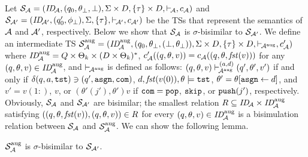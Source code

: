 Let ${\cal S}_{{\cal A}}=(\mathit{ID}_{\!{\cal A}},(q_0,\theta_{\bot},\bot),
\Sigma\times D,\{\tau\}\times D,{\vdash_{\!{\cal A}}},c_{{\cal A}})$
and ${\cal S}_{{\cal A}'}=(\mathit{ID}_{\!{\cal A}'},(q'_0,\phi_{\bot}),\allowbreak
\Sigma,\{\tau\},{\vdash_{\!{\cal A}'}},c_{{\cal A}'})$ be the TSs
that represent the semantics of ${\cal A}$ and ${\cal A}'$, respectively.
Below we show that ${\cal S}_{{\cal A}}$ is $\sigma$-bisimilar to
${\cal S}_{{\cal A}'}$.
We define an intermediate TS
${\cal S}_{{\cal A}}^{\mathrm{aug}}=
(\mathit{ID}_{\!{\cal A}}^{\mathrm{aug}},(q_0,\theta_{\bot},(\bot,\theta_{\bot})),
\Sigma\times D,\{\tau\}\times D,{\vdash_{\!{\cal A}^{\mathrm{aug}}}},c'_{{\cal A}})$
where
$\mathit{ID}_{\!{\cal A}}^{\mathrm{aug}}=Q\times\Theta_k\times(D\times\Theta_k)^*$,
$c'_{{\cal A}}((q,\theta,v))=c_{{\cal A}}((q,\theta,\mathit{fst}(v)))$ for
any $(q,\theta,v)\in\mathit{ID}_{\!{\cal A}}^{\mathrm{aug}}$,
and $\vdash_{\!{\cal A}^{\mathrm{aug}}}$ is defined as follows:
$(q,\theta,v)\vdash_{\!{\cal A}^{\mathrm{aug}}}^{(a,d)}(q',\theta',v')$
if and only if
$\delta(q,a,\mathtt{tst})\ni (q',\mathtt{asgn},\mathtt{com})$,
$d,\mathit{fst}(v(0)),\theta\models\mathtt{tst}$,
$\theta'=\theta[\mathtt{asgn}\gets d]$, and
$v'= v(1{:})$, $v$, or $(\theta'(j'),\theta')v$
if $\mathtt{com}=\mathtt{pop}$, $\mathtt{skip}$, or $\mathtt{push}(j')$, respectively.
Obviously,
${\cal S}_{{\cal A}}$ and ${\cal S}_{{\cal A}'}$ are bisimilar;
the smallest relation $R\subseteq \mathit{ID}_{\!{\cal A}}\times\mathit{ID}_{\!{\cal A}}^{\mathrm{aug}}$
satisfying
$((q,\theta,\mathit{fst}(v)),\allowbreak (q,\theta,v))\in R$
for every $(q,\theta,v)\in\mathit{ID}_{\!{\cal A}}^{\mathrm{aug}}$
is a bisimulation relation
between ${\cal S}_{{\cal A}}$ and ${\cal S}_{{\cal A}}^{\mathrm{aug}}$.
We can show the following lemma.
%
\begin{lemma}\label{lemma:bisim-rpda-pda}
${\cal S}_{{\cal A}}^{\mathrm{aug}}$ is $\sigma$-bisimilar to
${\cal S}_{{\cal A}'}$.
\end{lemma}

